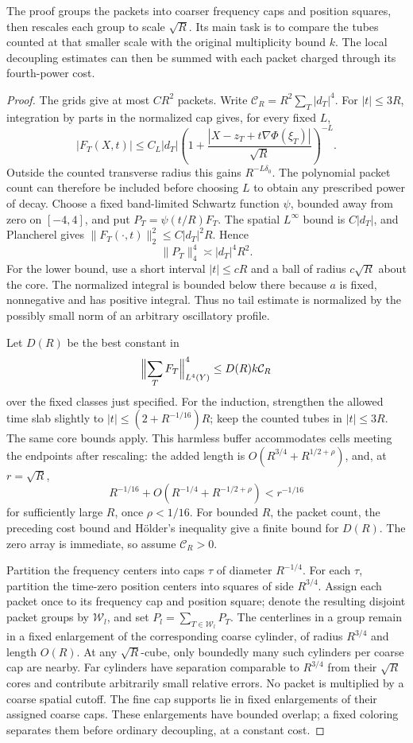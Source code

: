 The proof groups the packets into coarser frequency caps and position
squares, then rescales each group to scale $\sqrt R$. Its main task is
to compare the tubes counted at that smaller scale with the original
multiplicity bound $k$. The local decoupling estimates can then be
summed with each packet charged through its fourth-power cost.

\begin{proof}
The grids give at most \(C R^2\) packets. Write
\(\mathcal C_R=R^2\sum_T|d_T|^4\).
For \(|t|\le3R\), integration by parts in the normalized cap gives,
for every fixed \(L\),
\[
 |F_T(X,t)|
 \le C_L|d_T|
 \left(1+\frac{|X-z_T+t\nabla\Phi(\xi_T)|}{\sqrt R}\right)^{-L}.
\]
Outside the counted transverse radius this gains \(R^{-L\delta_0}\).
The polynomial packet count can therefore be included before choosing
$L$ to obtain any prescribed power of decay.  Choose a fixed
band-limited Schwartz function \(\psi\), bounded away from zero on
\([-4,4]\), and put \(P_T=\psi(t/R)F_T\).
The spatial \(L^\infty\) bound is \(C|d_T|\), and Plancherel gives
\(\|F_T(\cdot,t)\|_2^2\le C|d_T|^2R\). Hence
\[
 \|P_T\|_4^4\asymp |d_T|^4R^2.
\]
For the lower bound, use a short interval \(|t|\le cR\) and a
ball of radius \(c\sqrt R\) about the core. The normalized integral
is bounded below there because \(a\) is fixed, nonnegative and
has positive integral. Thus no tail estimate is normalized by the
possibly small norm of an arbitrary oscillatory profile.

Let \(D(R)\) be the best constant in
\[
 \Bigl\|\sum_TF_T\Bigr\|_{L^4(Y)}^4
                       \le D(R)k\mathcal C_R
\]
over the fixed classes just specified. For the induction, strengthen
the allowed time slab slightly to
\(|t|\le(2+R^{-1/16})R\); keep the counted tubes in \(|t|\le3R\).
The same core bounds apply. This harmless buffer accommodates cells
meeting the endpoints after rescaling: the added length is
\(O(R^{3/4}+R^{1/2+\rho})\), and, at \(r=\sqrt R\),
\[
 R^{-1/16}+O(R^{-1/4}+R^{-1/2+\rho})<r^{-1/16}
\]
for sufficiently large \(R\), once \(\rho<1/16\).
For bounded \(R\), the packet count, the preceding cost bound and
H\"older's inequality give a finite bound for \(D(R)\). The zero
array is immediate, so assume \(\mathcal C_R>0\).

Partition the frequency centers into caps \(\tau\) of diameter
\(R^{-1/4}\). For each \(\tau\), partition the time-zero position
centers into squares of side \(R^{3/4}\). Assign each packet once to
its frequency cap and position square; denote the resulting disjoint
packet groups by \(\mathcal W_l\), and set
\(P_l=\sum_{T\in\mathcal W_l}P_T\).
The centerlines in a group remain in a fixed enlargement of the
corresponding coarse cylinder, of radius \(R^{3/4}\) and length
\(O(R)\). At any \(\sqrt R\)-cube, only boundedly many such cylinders
per coarse cap are nearby. Far cylinders have separation comparable
to \(R^{3/4}\) from their \(\sqrt R\) cores and contribute arbitrarily
small relative errors. No packet is multiplied by a coarse spatial
cutoff. The fine cap supports lie in fixed enlargements of their
assigned coarse caps. These enlargements have bounded overlap; a
fixed coloring separates them before ordinary decoupling, at a
constant cost.


\end{proof}

